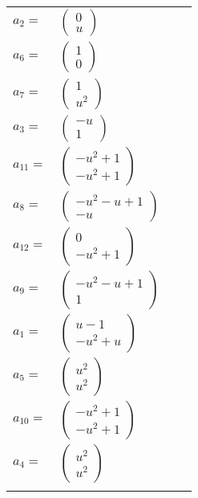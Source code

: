 \documentclass[1p]{elsarticle_modified}
\theoremstyle{definition}
\begin{document}
\begin{tabular}{m{7pt} m{180pt} m{7pt} m{180pt} }
\flushright $a_{2}=$&$\begin{pmatrix}0\\u\end{pmatrix}$ \\
\flushright $a_{6}=$&$\begin{pmatrix}1\\0\end{pmatrix}$ \\
\flushright $a_{7}=$&$\begin{pmatrix}1\\u^2\end{pmatrix}$ \\
\flushright $a_{3}=$&$\begin{pmatrix}- u\\1\end{pmatrix}$ \\
\flushright $a_{11}=$&$\begin{pmatrix}- u^2+1\\- u^2+1\end{pmatrix}$ \\
\flushright $a_{8}=$&$\begin{pmatrix}- u^2- u+1\\- u\end{pmatrix}$ \\
\flushright $a_{12}=$&$\begin{pmatrix}0\\- u^2+1\end{pmatrix}$ \\
\flushright $a_{9}=$&$\begin{pmatrix}- u^2- u+1\\1\end{pmatrix}$ \\
\flushright $a_{1}=$&$\begin{pmatrix}u-1\\- u^2+u\end{pmatrix}$ \\
\flushright $a_{5}=$&$\begin{pmatrix}u^2\\u^2\end{pmatrix}$ \\
\flushright $a_{10}=$&$\begin{pmatrix}- u^2+1\\- u^2+1\end{pmatrix}$ \\
\flushright $a_{4}=$&$\begin{pmatrix}u^2\\u^2\end{pmatrix}$\\&\end{tabular}
\end{document}

